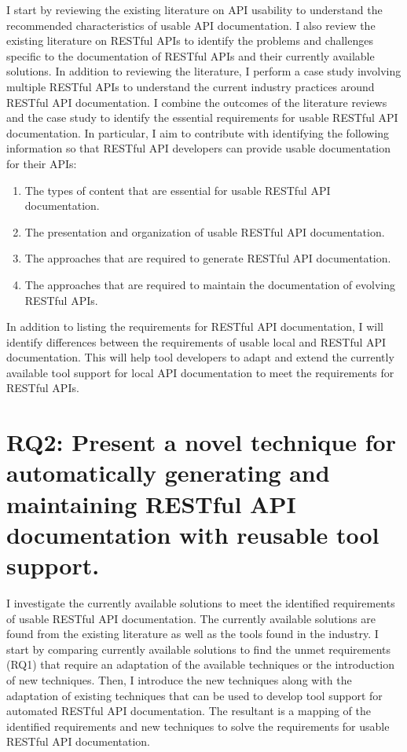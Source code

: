 \documentclass[11pt,oneside]{book}
\begin{document}
I start by reviewing the existing literature on API usability to understand the recommended characteristics of usable API documentation. I also review the existing literature on RESTful APIs to identify the problems and challenges specific to the documentation of RESTful APIs and their currently available solutions. In addition to reviewing the literature, I perform a case study involving multiple RESTful APIs to understand the current industry practices around RESTful API documentation. I combine the outcomes of the literature reviews and the case study to identify the essential requirements for usable RESTful API documentation. In particular, I aim to contribute with identifying the following information so that RESTful API developers can provide usable documentation for their APIs:

\begin{enumerate}
\item The types of content that are essential for usable RESTful API documentation.
\item The presentation and organization of usable RESTful API documentation.
\item The approaches that are required to generate RESTful API documentation.
\item The approaches that are required to maintain the documentation of evolving RESTful APIs.
\end{enumerate}

In addition to listing the requirements for RESTful API documentation, I will identify differences between the requirements of usable local and RESTful API documentation. This will help tool developers to adapt and extend the currently available tool support for local API documentation to meet the requirements for RESTful APIs.

\section{RQ2: Present a novel technique for automatically generating and maintaining RESTful API documentation with reusable tool support.}

I investigate the currently available solutions to meet the identified requirements of usable RESTful API documentation. The currently available solutions are found from the existing literature as well as the tools found in the industry. I start by comparing currently available solutions to find the unmet requirements (RQ1) that require an adaptation of the available techniques or the introduction of new techniques. Then, I introduce the new techniques along with the adaptation of existing techniques that can be used to develop tool support for automated RESTful API documentation. The resultant is a mapping of the identified requirements and new techniques to solve the requirements for usable RESTful API documentation.
\end{document}
